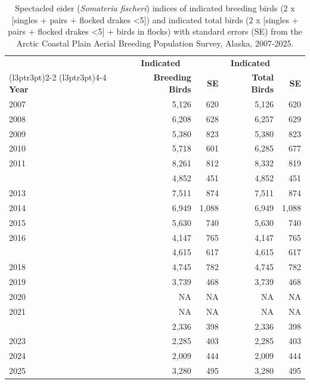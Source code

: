 \documentclass[
]{article}
\begin{document}
\begin{longtable}[t]{lrrrr}

\caption{\label{tbl-SPEI}Spectacled eider (\emph{Somateria fischeri})
indices of indicated breeding birds (2 x {[}singles + pairs + flocked
drakes \textless5{]}) and indicated total birds (2 x {[}singles + pairs
+ flocked drakes \textless5{]} + birds in flocks) with standard errors
(SE) from the Arctic Coastal Plain Aerial Breeding Population Survey,
Alaska, 2007-2025.}

\tabularnewline

\\
\toprule
\multicolumn{1}{c}{\textbf{ }} & \multicolumn{1}{c}{\textbf{Indicated}} & \multicolumn{1}{c}{\textbf{ }} & \multicolumn{1}{c}{\textbf{Indicated}} & \multicolumn{1}{c}{\textbf{ }} \\
\cmidrule(l{3pt}r{3pt}){2-2} \cmidrule(l{3pt}r{3pt}){4-4}
\textbf{Year} & \textbf{Breeding Birds} & \textbf{SE} & \textbf{Total Birds} & \textbf{SE}\\
\midrule
2007 & 5,126 & 620 & 5,126 & 620\\
2008 & 6,208 & 628 & 6,257 & 629\\
2009 & 5,380 & 823 & 5,380 & 823\\
2010 & 5,718 & 601 & 6,285 & 677\\
2011 & 8,261 & 812 & 8,332 & 819\\
\addlinespace
2012 & 4,852 & 451 & 4,852 & 451\\
2013 & 7,511 & 874 & 7,511 & 874\\
2014 & 6,949 & 1,088 & 6,949 & 1,088\\
2015 & 5,630 & 740 & 5,630 & 740\\
2016 & 4,147 & 765 & 4,147 & 765\\
\addlinespace
2017 & 4,615 & 617 & 4,615 & 617\\
2018 & 4,745 & 782 & 4,745 & 782\\
2019 & 3,739 & 468 & 3,739 & 468\\
2020 & NA & NA & NA & NA\\
2021 & NA & NA & NA & NA\\
\addlinespace
2022 & 2,336 & 398 & 2,336 & 398\\
2023 & 2,285 & 403 & 2,285 & 403\\
2024 & 2,009 & 444 & 2,009 & 444\\
2025 & 3,280 & 495 & 3,280 & 495\\
\bottomrule

\end{longtable}
\end{document}
